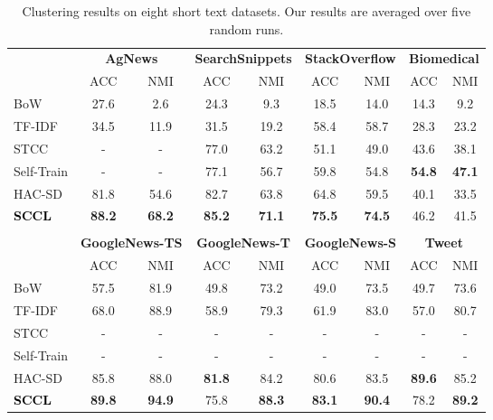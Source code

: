 \documentclass[11pt]{article}
\begin{document}
\begin{table*}[htbp]
  \begin{center}
    \begin{tabular}{lcccccccc}
      &\multicolumn{2}{c}{\textbf{AgNews}} 
      &\multicolumn{2}{c}{\textbf{SearchSnippets}} & \multicolumn{2}{c}{\textbf{StackOverflow}} & \multicolumn{2}{c}{\textbf{Biomedical}}  \\
      & ACC & NMI & ACC & NMI & ACC & NMI & ACC & NMI \\
      \cline{2-9}
      BoW &27.6 &2.6 & 24.3&9.3 &18.5&14.0 &14.3 &9.2 \\
      TF-IDF &34.5 &11.9 &31.5 &19.2 &58.4 &58.7 &28.3 &23.2 \\
{STCC} &- &- & 77.0 &63.2 &51.1 &49.0 &43.6 &38.1  \\
       Self-Train &- &- &77.1& 56.7& 59.8 &54.8 &\textbf{54.8}&\textbf{47.1} \\
      HAC-SD &81.8 &54.6 &82.7 &63.8 &64.8 &59.5 &40.1 &33.5 \\
      \hline
      \textcolor{black}{\textbf{SCCL}}&\textbf{88.2} &\textbf{68.2} &
      \textbf{85.2} &\textbf{71.1} &\textbf{75.5}&\textbf{74.5} &46.2 &41.5 \\ \\
     
      & \multicolumn{2}{c}{\textbf{GoogleNews-TS}} & \multicolumn{2}{c}{\textbf{GoogleNews-T}} & \multicolumn{2}{c}{\textbf{GoogleNews-S}}&
      \multicolumn{2}{c}{\textbf{Tweet}}  \\
      & ACC & NMI & ACC & NMI & ACC & NMI & ACC & NMI \\
      \cline{2-9}
      BoW &57.5 &81.9 &49.8 &73.2 &49.0 &73.5 &49.7 &73.6 \\
      TF-IDF &68.0 &88.9  &58.9 &79.3 &61.9 &83.0 &57.0 &80.7 \\
STCC & -&- &-&- &-&- &-&- \\
      Self-Train & -&- &- &- &-&- &-&- \\
      HAC-SD &85.8 &88.0 &\textbf{81.8} &84.2 &80.6 &83.5&\textbf{89.6} &85.2\\
      \hline  
      \textcolor{black}{\textbf{SCCL}}& \textbf{89.8}&\textbf{94.9} &75.8 &\textbf{88.3}  & \textbf{83.1} &\textbf{90.4} &78.2 &\textbf{89.2}\\
    \end{tabular}
    \caption{Clustering results on eight short text datasets. Our results are averaged over five random runs. }
    \label{tab:SOTA_compare}
  \end{center}
\end{table*}
\end{document}
